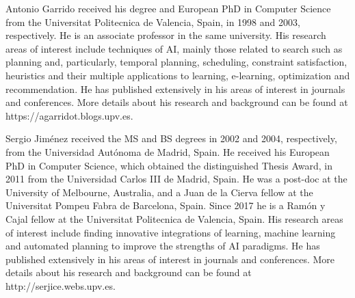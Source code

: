 \documentclass[10pt,journal,compsoc]{IEEEtran}
\begin{document}
\begin{IEEEbiography}{Antonio Garrido} received his degree and European PhD in Computer Science from the Universitat Politecnica de Valencia, Spain, in 1998 and 2003, respectively. He is an associate professor in the same university. His research areas of interest include techniques of AI, mainly those related to search such as planning and, particularly, temporal planning, scheduling, constraint satisfaction, heuristics and their multiple applications to learning, e-learning, optimization and recommendation. He has published extensively in his areas of interest in journals and conferences. More details about his research and background can be found at https://agarridot.blogs.upv.es.
\end{IEEEbiography}

\begin{IEEEbiography}{Sergio Jim\'enez} received the MS and BS degrees in 2002 and 2004, respectively, from the Universidad Aut\'onoma de Madrid, Spain. He received his European PhD in Computer Science, which obtained the distinguished Thesis Award, in 2011 from the Universidad Carlos III de Madrid, Spain. He was a post-doc at the University of Melbourne, Australia, and a Juan de la Cierva fellow at the Universitat Pompeu Fabra de Barcelona, Spain. Since 2017 he is a Ram\'on y Cajal fellow at the Universitat Politecnica de Valencia, Spain. 
His research areas of interest include finding innovative integrations of learning, machine learning and automated planning to improve the strengths of AI paradigms. He has published extensively in his areas of interest in journals and conferences. More details about his research and background can be found at http://serjice.webs.upv.es.
\end{IEEEbiography}
%

\end{document}
